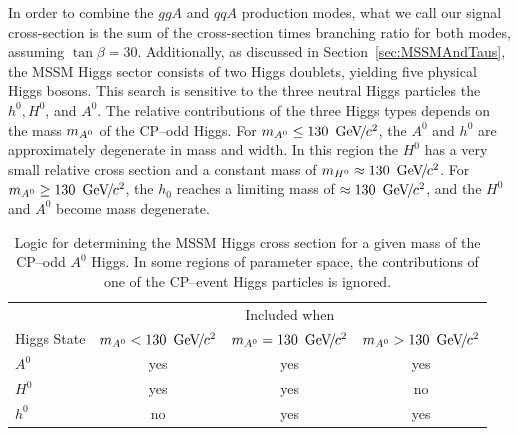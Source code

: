 In order to combine the $ggA$ and $qqA$ production modes, what we call our
signal cross-section is the sum of the cross-section times branching ratio for
both modes, assuming \mbox{$\tan\beta = 30$}.  Additionally, as discussed in
Section~\ref{sec:MSSMAndTaus}, the MSSM Higgs sector consists of two Higgs
doublets, yielding five physical Higgs bosons.  This search is sensitive to
the three neutral Higgs particles the $h^0, H^0$, and $A^0$.  The relative
contributions of the three Higgs types depends on the mass $\ma$ of the CP--odd 
Higgs.  For $m_{A^0} \leq
130~{\,\text{Ge\hspace{-.08em}V\hspace{-0.16em}/\hspace{-0.08em}}c^\text{2}}$, the $A^0$ and $h^0$ are approximately degenerate in mass and width.
In this region the $H^0$ has a very small relative cross section and a constant
mass of $m_{H^0} \approx 130~{\,\text{Ge\hspace{-.08em}V\hspace{-0.16em}/\hspace{-0.08em}}c^\text{2}}$.
For $m_{A^0} \geq 130~{\,\text{Ge\hspace{-.08em}V\hspace{-0.16em}/\hspace{-0.08em}}c^\text{2}}$, the $h_0$ reaches a limiting mass of $\approx
130~{\,\text{Ge\hspace{-.08em}V\hspace{-0.16em}/\hspace{-0.08em}}c^\text{2}}$, and the $H^0$ and $A^0$ become mass degenerate.   

\begin{table}
  \centering
  \begin{tabular}{l|ccc} 
                & \multicolumn{3}{|c}{Included when} \\
    Higgs State & $m_{A^0} < 130~{\,\text{Ge\hspace{-.08em}V\hspace{-0.16em}/\hspace{-0.08em}}c^\text{2}}$ & $m_{A^0} = 130~{\,\text{Ge\hspace{-.08em}V\hspace{-0.16em}/\hspace{-0.08em}}c^\text{2}}$ & $m_{A^0} > 130~{\,\text{Ge\hspace{-.08em}V\hspace{-0.16em}/\hspace{-0.08em}}c^\text{2}}$ \\
    \hline
    $A^0$       & yes & yes & yes \\
    $H^0$       & yes & yes & no \\
    $h^0$       & no & yes & yes \\
  \end{tabular}
  \caption[Contributions of different MSSM Higgs boson types at different
  $\ma$.]{Logic for determining the MSSM Higgs cross section for a given mass of
  the CP--odd $A^0$ Higgs.  In some regions of parameter space, the
  contributions of one of the
  CP--event Higgs particles is ignored.}
  \label{tab:HiggsXSectionCombination}
\end{table}


\ifx\master\undefined\fi
